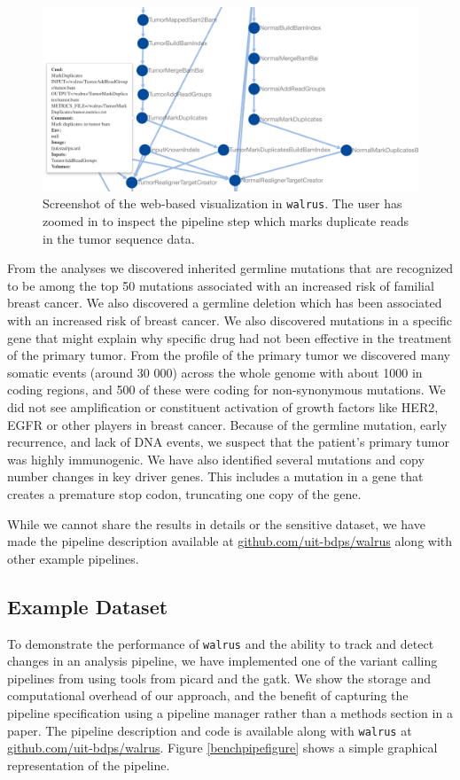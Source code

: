 \begin{figure}
    \centering 
    \includegraphics[width=12cm]{figures/webshot.png} 
    \caption{Screenshot of the web-based visualization in \texttt{walrus}. The
    user has zoomed in to inspect the pipeline step which marks duplicate reads
    in the tumor sequence data.}
    \label{webshotfig}
\end{figure} 


From the analyses we discovered inherited germline mutations that are recognized
to be among the top 50 mutations associated with an increased risk of familial
breast cancer. We also discovered a germline deletion which has been associated
with an increased risk of breast cancer. We also discovered mutations in a
specific gene that might explain why specific drug had not been effective in the
treatment of the primary tumor. From the profile of the primary tumor we
discovered many somatic events (around 30 000) across the whole genome with
about 1000 in coding regions, and 500 of these were coding for non-synonymous
mutations.  We did not see amplification or constituent activation of growth
factors like HER2, EGFR or other players in breast cancer. Because of the
germline mutation, early recurrence, and lack of DNA events, we suspect that the
patient's primary tumor was highly immunogenic. We have also identified several
mutations and copy number changes in key driver genes. This includes a mutation
in a gene that creates a premature stop codon, truncating one copy of the gene.

While we cannot share the results in details or the sensitive dataset, we have
made the pipeline description available at \url{github.com/uit-bdps/walrus}
along with other example pipelines. 

\subsection{Example Dataset}
To demonstrate the performance of \texttt{walrus} and the ability to track and
detect changes in an analysis pipeline, we have implemented one of the variant
calling pipelines from \cite{cornish2015comparison} using tools from picard and
the \gls{gatk}. We show the storage and computational overhead of our approach,
and the benefit of capturing the pipeline specification using a pipeline manager
rather than a methods section in a paper.  The pipeline description and code is
available along with \texttt{walrus} at \url{github.com/uit-bdps/walrus}. Figure
\ref{benchpipefigure} shows a simple graphical representation of the pipeline. 

